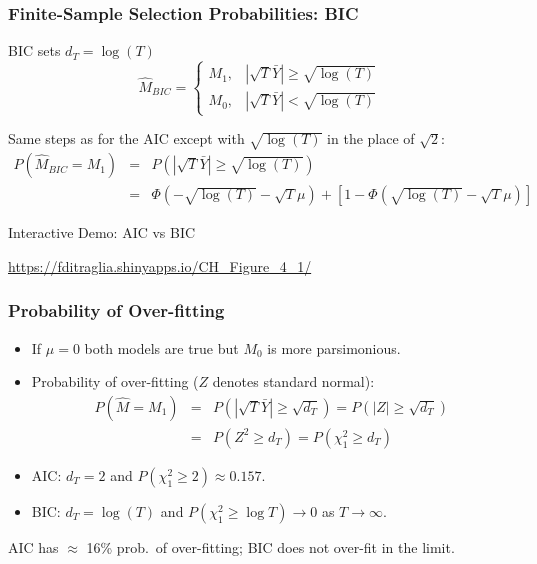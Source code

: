 \begin{frame}
  \frametitle{Finite-Sample Selection Probabilities: BIC}

  \begin{block}{BIC sets $d_T = \log(T)$}
	$$\widehat{M}_{BIC} = \left\{\begin{array}
		{cc} M_1, & |\sqrt{T}\bar{Y} | \geq \sqrt{\log(T)} \\
		M_0, & |\sqrt{T} \bar{Y}| < \sqrt{\log(T)}
	\end{array} \right.$$
  \end{block}

  \pause
Same steps as for the AIC except with $\sqrt{\log(T)}$ in the place of $\sqrt{2}$:
\footnotesize
	\begin{eqnarray*}
		P\left(\widehat{M}_{BIC} = M_1\right) &=& P\left(\left|\sqrt{T}\bar{Y} \right| \geq \sqrt{\log(T)}  \right)\\
			&=& \Phi\left(-\sqrt{\log(T)} - \sqrt{T}\mu\right) + \left[1 -  \Phi\left(\sqrt{\log(T)} - \sqrt{T} \mu \right)\right]
	\end{eqnarray*}

  \pause

  \begin{block}{Interactive Demo: AIC vs BIC}

\url{https://fditraglia.shinyapps.io/CH\_Figure\_4\_1/}
  \end{block}
\end{frame}
\begin{frame}
  \frametitle{Probability of Over-fitting}

  \small

  \begin{itemize}
    \item If $\mu = 0$ both models are true but $M_0$ is more parsimonious.\pause 
    \item Probability of over-fitting ($Z$ denotes standard normal): 
\begin{eqnarray*}
	P\left(\widehat{M} = M_1\right) &=& P\left(|\sqrt{T}\bar{Y}|\geq \sqrt{d_T}\right) = P(|Z|\geq \sqrt{d_T})\\
	 &=& P(Z^2 \geq d_T) = P(\chi^2_1 \geq d_T)
\end{eqnarray*}\pause
\item AIC: $d_T = 2$ and $P(\chi^2_1 \geq 2)\approx 0.157$.  \pause
\item BIC: $d_T = \log(T)$ and $P(\chi^2_1 \geq \log T) \rightarrow 0$ as $T\rightarrow \infty$.
  \end{itemize}

  \alert{AIC has $\approx$ 16\% prob.\ of over-fitting; BIC does not over-fit in the limit.}

\end{frame}

